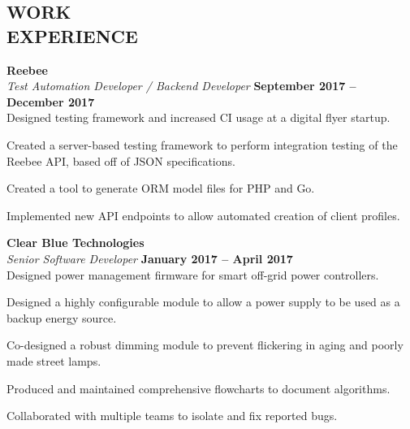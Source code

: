 \documentclass[margin,line]{resume}
\begin{document}
\begin{resume}
\sectionline

    \section{\mysidestyle \textbf{\large{W}\small{ORK}\\ \large{E}\small{XPERIENCE}}}

    \textbf{\listing Reebee} \vspace{2mm}\\\vspace{1mm}%
    \textsl{Test Automation Developer / Backend Developer} \hfill \textbf{September 2017 -- December 2017}\\
    Designed testing framework and increased CI usage at a digital flyer startup.\\
    \begin{tightemize}
    \item Created a server-based testing framework to perform integration testing of the Reebee API, based off of JSON specifications.
    \item Created a tool to generate ORM model files for PHP and Go.
    \item Implemented new API endpoints to allow automated creation of client profiles.
    \end{tightemize}

    \vspace{1mm}
    \textbf{\listing Clear Blue Technologies} \vspace{2mm}\\\vspace{1mm}%
    \textsl{Senior Software Developer} \hfill \textbf{January 2017 -- April 2017}\\
    Designed power management firmware for smart off-grid power controllers. \\
    \begin{tightemize}
    \item Designed a highly configurable module to allow a power supply to be used as a backup energy source.
    \item Co-designed a robust dimming module to prevent flickering in aging and poorly made street lamps.
    \item Produced and maintained comprehensive flowcharts to document algorithms.
    \item Collaborated with multiple teams to isolate and fix reported bugs.
    \end{tightemize}


\end{resume}
\end{document}
